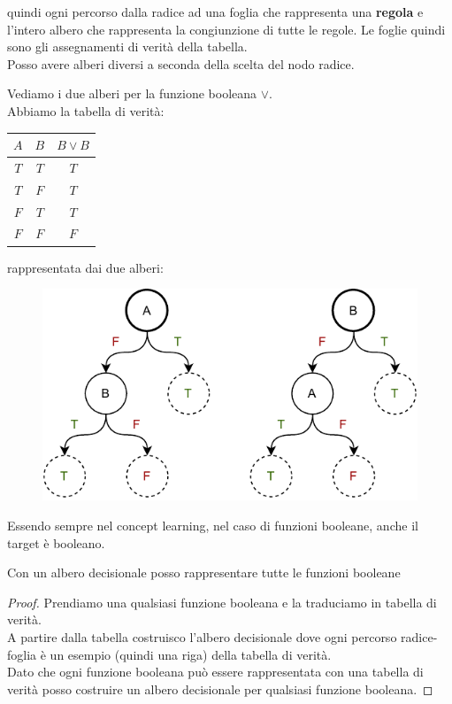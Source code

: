 \documentclass[a4paper,12pt, oneside]{book}
\begin{document}
quindi ogni percorso dalla radice ad una foglia che rappresenta una
\textbf{regola} e l'intero albero che rappresenta la congiunzione di tutte le
regole. Le foglie quindi sono gli assegnamenti di verità della tabella.\\ 
Posso avere alberi diversi a seconda della scelta del nodo radice.\\
\begin{esempio}
  Vediamo i due alberi per la funzione booleana $\lor$.\\
  Abbiamo la tabella di verità:
  \begin{table}[H]
    \centering
    \begin{tabular}{c|c|c}
      $A$ & $B$ & $B\lor B$\\
      \hline
      $T$ & $T$ & $T$\\
      $T$ & $F$ & $T$\\
      $F$ & $T$ & $T$\\
      $F$ & $F$ & $F$
    \end{tabular}
  \end{table}
  rappresentata dai due alberi:
  \begin{figure}[H]
    \centering
    \includegraphics[scale = 0.9]{img/dt1.pdf}
  \end{figure}
\end{esempio}
Essendo sempre nel concept learning, nel caso di funzioni booleane, anche il
target è booleano.
\begin{teorema}
  Con un albero decisionale posso rappresentare tutte le
  funzioni booleane
\end{teorema}
\begin{proof}
  Prendiamo una qualsiasi funzione booleana e la traduciamo in tabella di
  verità.\\
  A partire dalla tabella costruisco l'albero decisionale dove ogni percorso
  radice-foglia è un esempio (quindi una riga) della tabella di verità.\\
  Dato che ogni funzione booleana può essere rappresentata con una tabella di
  verità posso costruire un albero decisionale per qualsiasi funzione booleana.
\end{proof}
\end{document}
